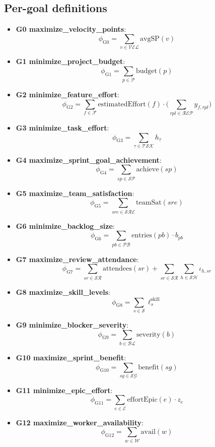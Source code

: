 \documentclass[a4paper,11pt]{article}
\begin{document}
\subsection*{Per-goal definitions}
\begin{itemize}[leftmargin=2em]
  \item \textbf{G0 maximize\_velocity\_points}:
  \[
    \phi_{\text{G0}}=\sum_{v\in\mathcal{VEL}}\mathrm{avgSP}(v)
  \]
  \item \textbf{G1 minimize\_project\_budget}:
  \[
    \phi_{\text{G1}}=\sum_{p\in\mathcal{P}}\mathrm{budget}(p)
  \]
  \item \textbf{G2 minimize\_feature\_effort}:
  \[
    \phi_{\text{G2}}=\sum_{f\in\mathcal{F}} \mathrm{estimatedEffort}(f)\cdot\Big(\sum_{rpl\in\mathcal{REP}} y_{f,rpl}\Big)
  \]
  \item \textbf{G3 minimize\_task\_effort}:
  \[
    \phi_{\text{G3}}=\sum_{\tau\in\mathcal{TSK}} h_{\tau}
  \]
  \item \textbf{G4 maximize\_sprint\_goal\_achievement}:
  \[
    \phi_{\text{G4}}=\sum_{sp\in\mathcal{SP}} \mathrm{achieve}(sp)
  \]
  \item \textbf{G5 maximize\_team\_satisfaction}:
  \[
    \phi_{\text{G5}}=\sum_{sre\in\mathcal{SRE}} \mathrm{teamSat}(sre)
  \]
  \item \textbf{G6 minimize\_backlog\_size}:
  \[
    \phi_{\text{G6}}=\sum_{pb\in\mathcal{PB}} \mathrm{entries}(pb)\cdot b_{pb}
  \]
  \item \textbf{G7 maximize\_review\_attendance}:
  \[
    \phi_{\text{G7}}=\sum_{sr\in\mathcal{SR}} \mathrm{attendees}(sr) + \sum_{sr\in\mathcal{SR}}\sum_{h\in\mathcal{SH}} \iota_{h,sr}
  \]
  \item \textbf{G8 maximize\_skill\_levels}:
  \[
    \phi_{\text{G8}}=\sum_{s\in\mathcal{S}} \ell^{\text{skill}}_{s}
  \]
  \item \textbf{G9 minimize\_blocker\_severity}:
  \[
    \phi_{\text{G9}}=\sum_{b\in\mathcal{BL}} \mathrm{severity}(b)
  \]
  \item \textbf{G10 maximize\_sprint\_benefit}:
  \[
    \phi_{\text{G10}}=\sum_{sg\in\mathcal{SG}} \mathrm{benefit}(sg)
  \]
  \item \textbf{G11 minimize\_epic\_effort}:
  \[
    \phi_{\text{G11}}=\sum_{e\in\mathcal{E}} \mathrm{effortEpic}(e)\cdot z_e
  \]
  \item \textbf{G12 maximize\_worker\_availability}:
  \[
    \phi_{\text{G12}}=\sum_{w\in\mathcal{W}} \mathrm{avail}(w)
  \]
\end{itemize}
\end{document}
